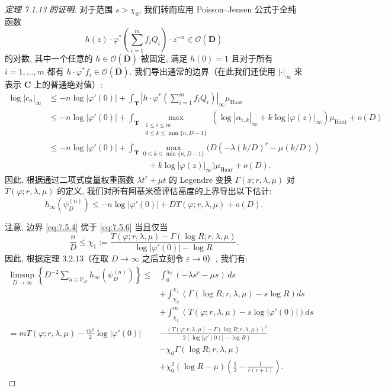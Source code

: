 \begin{proof}[定理 7.1.13 的证明]
对于范围 \(s > \chi_0\), 我们转而应用 Poisson--Jensen 公式于全纯函数
\[ h(z) \cdot \varphi^* \left( \sum_{i=1}^m f_i Q_i \right) \cdot z^{-n} \in \mathcal{O}(\overline{\mathbf{D}}) \]
的对数, 其中一个任意的 \(h \in \mathcal{O}(\overline{\mathbf{D}})\) 被固定, 
满足 \(h(0) = 1\) 且对于所有 \(i = 1, \dots, m\) 都有 \(h \cdot \varphi^* f_i \in \mathcal{O}(\overline{\mathbf{D}})\). 
我们导出通常的边界（在此我们还使用 \(|\cdot|_{\infty}\) 来表示 \(\mathbf{C}\) 上的普通绝对值）:
\[
\begin{aligned}
\log |c_n|_{\infty} &\le -n\log|\varphi'(0)| + \int_{\mathbf{T}} \left| h \cdot \varphi^* \left( \sum_{i=1}^m f_i Q_i \right) \right|_{\infty} \mu_{\text{Haar}} \\
&\le -n\log|\varphi'(0)| + \int_{\mathbf{T}} \max_{\substack{1 \leq i \leq m \\ 0 \leq k \leq \min\{n, D-1\}}} (\log|\alpha_{i,k}|_{\infty} + k\log|\varphi(z)|_{\infty}) \mu_{\text{Haar}} + o(D) \\
&\le -n\log|\varphi'(0)| + \int_{\mathbf{T}} \max_{0 \leq k \leq \min\{n, D-1\}} \Big( D(-\lambda(k/D)^r - \mu(k/D)) \\
&\qquad\qquad\qquad\qquad\qquad\qquad + k\log|\varphi(z)|_{\infty} \Big) \mu_{\text{Haar}} + o(D).
\end{aligned}
\]
因此, 根据通过二项式度量权重函数 \(\lambda t^r + \mu t\) 
的 Legendre 变换 \(\Gamma(x; r, \lambda, \mu)\) 对 \(T(\varphi; r, \lambda, \mu)\) 的定义, 
我们对所有阿基米德评估高度的上界导出以下估计:
\begin{equation}\label{eq:7.5.6}
h_{\infty}(\psi_D^{(n)}) \le -n\log|\varphi'(0)| + DT(\varphi; r, \lambda, \mu) + o(D).
\end{equation}

注意, 边界 \eqref{eq:7.5.4} 优于 \eqref{eq:7.5.6} 当且仅当
\[ \frac{n}{D} \le \chi_1 := \frac{T(\varphi; r, \lambda, \mu) - \Gamma(\log R; r, \lambda, \mu)}{\log |\varphi'(0)| - \log R}. \]
因此, 根据定理 3.2.13（在取 \(D \to \infty\) 之后立刻令 \(\varepsilon \to 0\)）, 我们有:
\begin{equation}\label{eq:7.5.7}
\begin{aligned}
\limsup_{D \to \infty} \left\{ D^{-2} \sum_{n \in \mathcal{V}_D} h_{\infty}(\psi_D^{(n)}) \right\} \le &\int_0^{\chi_0} (-\lambda s^r - \mu s) \, ds \\
&+ \int_{\chi_0}^{\chi_1} \left( \Gamma(\log R; r, \lambda, \mu) - s \log R \right) ds \\
&+ \int_{\chi_1}^m \left( T(\varphi; r, \lambda, \mu) - s \log |\varphi'(0)| \right) ds \\
= mT(\varphi; r, \lambda, \mu) - \frac{m^2}{2} \log |\varphi'(0)| &- \frac{(T(\varphi; r, \lambda, \mu) - \Gamma(\log R; r, \lambda, \mu))^2}{2(\log |\varphi'(0)| - \log R)} \\
&- \chi_0 \Gamma(\log R; r, \lambda, \mu) \\
&+ \chi_0^2(\log R - \mu) \left( \frac{1}{2} - \frac{1}{r(r+1)} \right).
\end{aligned}
\end{equation}


\end{proof}
